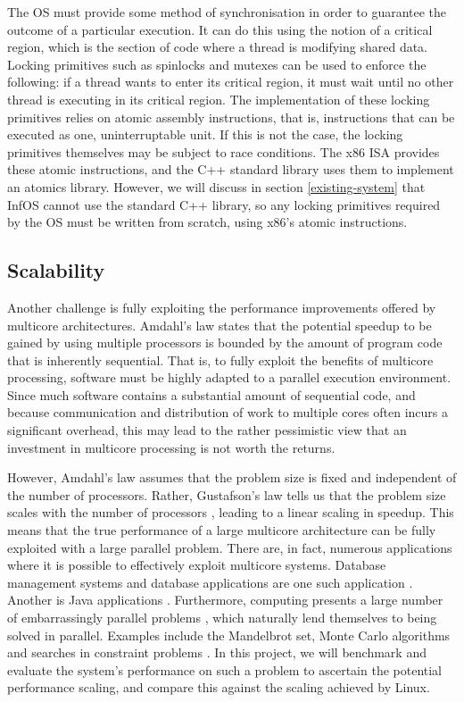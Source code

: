 \documentclass[bsc,frontabs,twoside,singlespacing,parskip,deptreport]{infthesis}     %
\begin{document}
The OS must provide some method of synchronisation in order to guarantee the outcome of a particular execution. It can do this using the notion of a critical region, which is the section of code where a thread is modifying shared data. Locking primitives such as spinlocks and mutexes can be used to enforce the following: if a thread wants to enter its critical region, it must wait until no other thread is executing in its critical region. The implementation of these locking primitives relies on atomic assembly instructions, that is, instructions that can be executed as one, uninterruptable unit. If this is not the case, the locking primitives themselves may be subject to race conditions. The x86 ISA provides these atomic instructions, and the C++ standard library uses them to implement an atomics library. However, we will discuss in section \ref{existing-system} that InfOS cannot use the standard C++ library, so any locking primitives required by the OS must be written from scratch, using x86's atomic instructions.

\subsection{Scalability} \label{scalability-challenges}
Another challenge is fully exploiting the performance improvements offered by multicore architectures. Amdahl’s law \cite{DBLP:conf/afips/Amdahl67} \cite{DBLP:journals/computer/Amdahl13} states that the potential speedup to be gained by using multiple processors is bounded by the amount of program code that is inherently sequential. That is, to fully exploit the benefits of multicore processing, software must be highly adapted to a parallel execution environment. Since much software contains a substantial amount of sequential code, and because communication and distribution of work to multiple cores often incurs a significant overhead, this may lead to the rather pessimistic view that an investment in multicore processing is not worth the returns.

However, Amdahl’s law assumes that the problem size is fixed and independent of the number of processors. Rather, Gustafson’s law tells us that the problem size scales with the number of processors \cite{DBLP:journals/cacm/Gustafson88}, leading to a linear scaling in speedup. This means that the true performance of a large multicore architecture can be fully exploited with a large parallel problem. There are, in fact, numerous applications where it is possible to effectively exploit multicore systems. Database management systems and database applications are one such application \cite{DBLP:journals/queue/McDougall05}. Another is Java applications \cite{DBLP:journals/usenix-login/McDougallL06}. Furthermore, computing presents a large number of embarrassingly parallel problems \cite{DBLP:books/daglib/0020056}, which naturally lend themselves to being solved in parallel. Examples include the Mandelbrot set, Monte Carlo algorithms \cite{DBLP:conf/uai/NeiswangerWX14} and searches in constraint problems \cite{DBLP:journals/jair/MalapertRR16}. In this project, we will benchmark and evaluate the system’s performance on such a problem to ascertain the potential performance scaling, and compare this against the scaling achieved by Linux.
\end{document}
